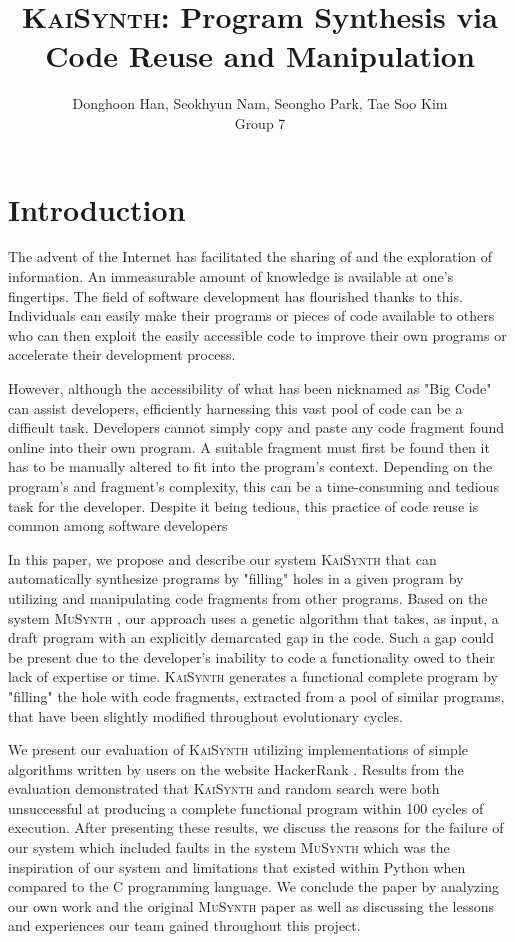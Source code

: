 \documentclass{article}
\title{\textsc{KaiSynth}: Program Synthesis via Code Reuse and Manipulation}
\author{Donghoon Han, Seokhyun Nam, Seongho Park, Tae Soo Kim\\Group 7}
\begin{document}
\maketitle

\section{Introduction}
The advent of the Internet has facilitated the sharing of and the exploration of information. An immeasurable amount of knowledge is available at one's fingertips. The field of software development has flourished thanks to this. Individuals can easily make their programs or pieces of code available to others who can then exploit the easily accessible code to improve their own programs or accelerate their development process.

However, although the accessibility of what has been nicknamed as "Big Code" can assist developers, efficiently harnessing this vast pool of code can be a difficult task. Developers cannot simply copy and paste any code fragment found online into their own program. A suitable fragment must first be found then it has to be manually altered to fit into the program's context. Depending on the program's and fragment's complexity, this can be a time-consuming and tedious task for the developer. Despite it being tedious, this practice of code reuse is common among software developers 

In this paper, we propose and describe our system \textsc{KaiSynth} that can automatically synthesize programs by "filling" holes in a given program by utilizing and manipulating code fragments from other programs. Based on the system \textsc{MuSynth} \cite{musynth}, our approach uses a genetic algorithm that takes, as input, a draft program with an explicitly demarcated gap in the code. Such a gap could be present due to the developer's inability to code a functionality owed to their lack of expertise or time. \textsc{KaiSynth} generates a functional complete program by "filling" the hole with code fragments, extracted from a pool of similar programs, that have been slightly modified throughout evolutionary cycles. 

We present our evaluation of \textsc{KaiSynth} utilizing implementations of simple algorithms written by users on the website HackerRank \cite{hackerrank}. Results from the evaluation demonstrated that \textsc{KaiSynth} and random search were both unsuccessful at producing a complete functional program within 100 cycles of execution. After presenting these results, we discuss the reasons for the failure of our system which included faults in the system \textsc{MuSynth} which was the inspiration of our system and limitations that existed within Python when compared to the C programming language. We conclude the paper by analyzing our own work and the original \textsc{MuSynth} paper as well as discussing the lessons and experiences our team gained throughout this project.
\end{document}
